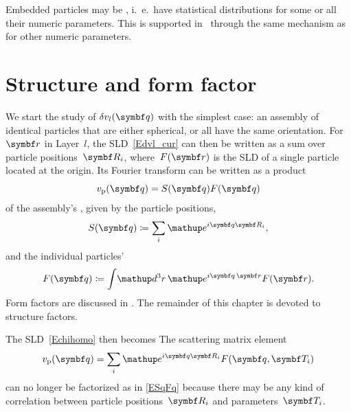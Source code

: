 %
%
%
%
Embedded particles may be , i.~e.\ have statistical distributions
for some or all their numeric parameters.
This is supported in \BornAgain\ through the same mechanism
as for other numeric parameters.




\section{Structure and form factor}\label{SPartFactors}

We start the study of $\delta v_l(\q)$ with the simplest case:
an assembly of identical particles
that are either spherical, or all have the same orientation.
For $\r$ in Layer~$l$, the SLD~\cref{Edvl_cur}
can then be written as a sum over particle positions~$\R_i$,
where~$F(\r)$ is the SLD of a single particle located at the origin.
Its Fourier transform can be written as a product
\begin{equation}\label{ESqFq}
  v_\sp(\q) = S(\q) F(\q)
\end{equation}
of the assembly's , given by the particle positions,
\begin{equation}\label{EdefSq}
  S(\q) \coloneqq \sum_i \e^{i\q\R_i},
\end{equation}
and the individual particles' 
\begin{equation}\label{EdefFq}
  F(\q) \coloneqq \int\!\d^3r\, \e^{i\v{q}\,\r} F(\r).
\end{equation}
Form factors are discussed in .
The remainder of this chapter is devoted to structure factors.

The SLD~\cref{Echihomo} then becomes
The scattering matrix element
\begin{equation}\label{Echiqsum}
  v_\sp(\q) = \sum_i \e^{i\q\R_i} F(\q,\v{T}_i)
\end{equation}
can no longer be factorized as in \cref{ESqFq}
because there may be any kind of correlation
between particle positions~$\R_i$ and parameters~$\v{T}_i$.

